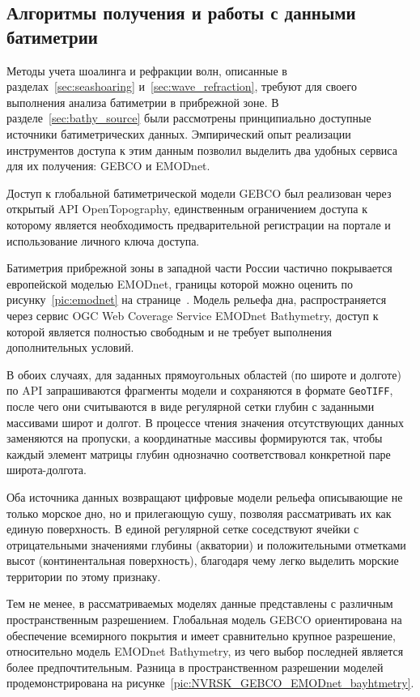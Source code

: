 \subsection{Алгоритмы получения и работы с данными батиметрии}

Методы учета шоалинга и рефракции волн, описанные в разделах~\ref{sec:seashoaring} и~\ref{sec:wave_refraction}, требуют для своего выполнения анализа батиметрии в прибрежной зоне.
В разделе~\ref{sec:bathy_source} были рассмотрены принципиально доступные источники батиметрических данных.
Эмпирический опыт реализации инструментов доступа к этим данным позволил выделить два удобных сервиса для их получения: GEBCO и EMODnet.

Доступ к глобальной батиметрической модели GEBCO был реализован через открытый API OpenTopography, единственным ограничением доступа к которому является необходимость предварительной регистрации на портале и использование личного ключа доступа.

Батиметрия прибрежной зоны в западной части России частично покрывается европейской моделью EMODnet, границы которой можно оценить по рисунку~\ref{pic:emodnet} на странице~\pageref{pic:emodnet}.
Модель рельефа дна, распространяется через сервис OGC Web Coverage Service EMODnet Bathymetry, доступ к которой является полностью свободным и не требует выполнения дополнительных условий.

В обоих случаях, для заданных прямоугольных областей (по широте и долготе) по API запрашиваются фрагменты модели и сохраняются в формате \texttt{GeoTIFF}, после чего они считываются в виде регулярной сетки глубин с заданными массивами широт и долгот. 
В процессе чтения значения отсутствующих данных заменяются на пропуски, а координатные массивы формируются так, чтобы каждый элемент матрицы глубин однозначно соответствовал конкретной паре широта-долгота.

Оба источника данных возвращают цифровые модели рельефа описывающие не только морское дно, но и прилегающую сушу, позволяя рассматривать их как единую поверхность.
В единой регулярной сетке соседствуют ячейки с отрицательными значениями глубины (акватории) и положительными отметками высот (континентальная поверхность), благодаря чему легко выделить морские территории по этому признаку.

Тем не менее, в рассматриваемых моделях данные представлены с различным пространственным разрешением.
Глобальная модель GEBCO ориентирована на обеспечение всемирного покрытия и имеет сравнительно крупное разрешение, относительно модель EMODnet Bathymetry, из чего выбор последней является более предпочтительным.
Разница в пространственном разрешении моделей продемонстрирована на рисунке~\ref{pic:NVRSK_GEBCO_EMODnet_bayhtmetry}.

